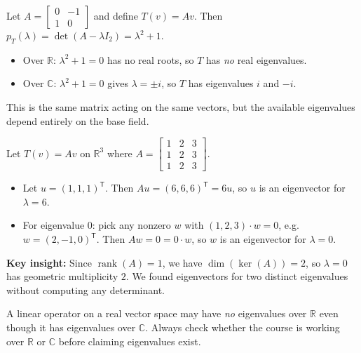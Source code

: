 \begin{examplebox}[title={Worked Example (Lecture Week 8): rotation matrix over $\mathbb{R}$ vs $\mathbb{C}$}]
Let $A=\begin{bmatrix}0&-1\\1&0\end{bmatrix}$ and define $T(v)=Av$.
Then $p_T(\lambda)=\det(A-\lambda I_2)=\lambda^2+1$.
\begin{itemize}
\item Over $\mathbb{R}$: $\lambda^2+1=0$ has no real roots, so $T$ has \emph{no} real eigenvalues.
\item Over $\mathbb{C}$: $\lambda^2+1=0$ gives $\lambda=\pm i$, so $T$ has eigenvalues $i$ and $-i$.
\end{itemize}
This is the same matrix acting on the same vectors, but the available eigenvalues depend entirely on the base field.
\end{examplebox}

\begin{examplebox}[title={Worked Example (Lecture Week 8): spotting eigenvectors without computation}]
Let $T(v)=Av$ on $\mathbb{R}^3$ where $A=\begin{bmatrix}1&2&3\\1&2&3\\1&2&3\end{bmatrix}$.
\begin{itemize}
\item Let $u=(1,1,1)^{\mathsf T}$. Then $Au=(6,6,6)^{\mathsf T}=6u$, so $u$ is an eigenvector for $\lambda=6$.
\item For eigenvalue $0$: pick any nonzero $w$ with $(1,2,3)\cdot w=0$, e.g.\ $w=(2,-1,0)^{\mathsf T}$. Then $Aw=0=0\cdot w$, so $w$ is an eigenvector for $\lambda=0$.
\end{itemize}
\textbf{Key insight:} Since $\operatorname{rank}(A)=1$, we have $\dim(\ker(A))=2$, so $\lambda=0$ has geometric multiplicity $2$.
We found eigenvectors for two distinct eigenvalues without computing any determinant.
\end{examplebox}

\begin{commonmistake}[title={Common Mistake: eigenvalues depend on the base field}]
A linear operator on a real vector space may have \emph{no} eigenvalues over $\mathbb{R}$ even though it has eigenvalues over $\mathbb{C}$.
Always check whether the course is working over $\mathbb{R}$ or $\mathbb{C}$ before claiming eigenvalues exist.
\end{commonmistake}

